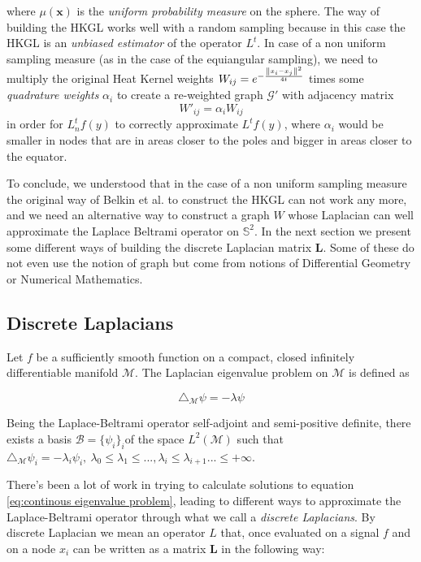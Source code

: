  where $\mu(\mathbf x)$ is the \textit{uniform probability measure} on the sphere.
The way of building the HKGL works well with a random sampling because in this case the HKGL is an \textit{unbiased estimator} of the operator $L^t$. In case of a non uniform sampling measure (as in the case of the equiangular sampling), we need to multiply the original Heat Kernel weights $W_{i j}=e^{-\frac{\left\lVert x_i-x_j\right\rVert^2}{4t}}$ times some \textit{quadrature weights} $\alpha_i$ to create a re-weighted graph $\mathcal G'$ with adjacency matrix
$$
W'_{i j} = \alpha_i W_{i j}
$$
in order for $L_n^tf(y)$ to correctly approximate $L^tf(y)$, where $\alpha_i$ would be smaller in nodes that are in areas closer to the poles and bigger in areas closer to the equator. 

To conclude, we understood that in the case of a non uniform sampling measure the original way of Belkin et al. to construct the HKGL can not work any more, and we need an alternative way to construct a graph $W$ whose Laplacian can well approximate the Laplace Beltrami operator on $\mathbb S^2$. In the next section we present some different ways of building the discrete Laplacian matrix $\mathbf L$. Some of these do not even use the notion of graph but come from notions of Differential Geometry or Numerical Mathematics.

\subsection{Discrete Laplacians}\label{sec:Chapter3: other discrete laplacians}
Let $f$ be a sufficiently smooth function on a compact, closed infinitely differentiable manifold $\mathcal M$. The Laplacian eigenvalue problem on $\mathcal M$ is defined as 

\begin{equation}\label{eq:continous eigenvalue problem}
	\triangle_{\mathcal M}\psi = -\lambda \psi
\end{equation}


Being the Laplace-Beltrami operator self-adjoint and semi-positive definite, there exists a basis $\mathcal B=\{\psi_i\}_i$of the space $L^2(\mathcal M)$ such that $\triangle_\mathcal M \psi_i = -\lambda_i\psi_i,\ \lambda_0\leq\lambda_1\leq...,\lambda_i\leq\lambda_{i+1}...\leq+\infty$.

There's been a lot of work in trying to calculate solutions to equation \ref{eq:continous eigenvalue problem}, leading to different ways to approximate the Laplace-Beltrami operator through what we call a \textit{discrete Laplacians}. By discrete Laplacian we mean an operator $L$ that, once evaluated on a signal $f$ and on a node $x_i$ can be written as a matrix $\mathbf L$ in the following way:

